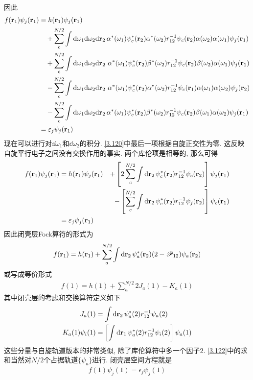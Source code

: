 因此
\begin{align}
	f(\mathbf{r}_1)\psi_j(\mathbf{r}_1) & = h(\mathbf{r}_1)\psi_j(\mathbf{r}_1)\notag\\
	& {}\quad + \sum_c^{N/2}\int\dd\omega_1\dd\omega_2\dd{r}_2\,\alpha^*(\omega_1)\psi_c^*(\mathbf{r}_2)\alpha^*(\omega_2)\twoe\psi_c(\mathbf{r}_2)\alpha(\omega_2)\alpha(\omega_1)\psi_j(\mathbf{r}_1)\notag\\
	& {}\quad + \sum_c^{N/2}\int\dd\omega_1\dd\omega_2\dd{r}_2\,\,\alpha^*(\omega_1)\psi_c^*(\mathbf{r}_2)\beta^*(\omega_2)\twoe\psi_c(\mathbf{r}_2)\beta(\omega_2)\alpha(\omega_1)\psi_j(\mathbf{r}_1)\notag\\
	& {}\quad - \sum_c^{N/2}\int\dd\omega_1\dd\omega_2\dd{r}_2\,\,\alpha^*(\omega_1)\psi_c^*(\mathbf{r}_2)\alpha^*(\omega_2)\twoe\psi_c(\mathbf{r}_1)\alpha(\omega_1)\alpha(\omega_2)\psi_j(\mathbf{r}_2)\notag\\
	& {}\quad - \sum_c^{N/2}\int\dd\omega_1\dd\omega_2\dd{r}_2\,\alpha^*(\omega_1)\psi_c^*(\mathbf{r}_2)\beta^*(\omega_2)\twoe\psi_c(\mathbf{r}_2)\beta(\omega_1)\alpha(\omega_2)\psi_j(\mathbf{r}_1)\notag\\
	& = \epsilon_j\psi_j(\mathbf{r}_1)
	\label{3.120}
\end{align}
现在可以进行对$\dd\omega_1$和$\dd\omega_2$的积分. 
\eqref{3.120}中最后一项根据自旋正交性为零. 
这反映自旋平行电子之间没有交换作用的事实. 
两个库伦项是相等的, 
那么可得
\begin{alignat}{3}
	f(\mathbf{r}_1)\psi_j(\mathbf{r}_1) 
	& = h(\mathbf{r}_1)\psi_j(\mathbf{r}_1) & + \left[ 2\sum_c^{N/2}\int\dd{r}_2\,\psi_c^*(\mathbf{r}_2)\twoe\psi_c(\mathbf{r}_2)\right]\psi_j(\mathbf{r}_1)\notag\\
	&                                       & - \left[  \sum_c^{N/2}\int\dd{r}_2\,\psi_c^*(\mathbf{r}_2)\twoe\psi_j(\mathbf{r}_2)\right]\psi_c(\mathbf{r}_1)\notag\\
	& = \epsilon_j\psi_j(\bfr_1)&
\end{alignat}
因此闭壳层Fock算符的形式为
\begin{align}
	\label{3.122}
	f(\bfr_1) = h(\bfr_1) + \sum_a^{N/2}\int\dd{r}_2\,\psi_a^*(\bfr_2)(2-\scr{P}_{12})\psi_a(\bfr_2)
\end{align}
或写成等价形式
\begin{align}
	f(1) = h(1) + \sum_a^{N/2} 2J_a(1) - K_a(1)
\end{align}
其中闭壳层的考虑和交换算符定义如下
\begin{align}
	J_a(1) & = \int\dd{r}_2\,\psi_a^*(2)\twoe\psi_a(2)\\
	K_a(1) \psi_i(1) & = \left[ \int\dd{r}_1\,\psi_a^*(2)\twoe\psi_i(2) \right]\psi_a(1)
\end{align}
这些分量与自旋轨道版本的非常类似, 
除了库伦算符中多一个因子$2$. 
\eqref{3.122}中的求和当然对$N/2$个占据轨道$\{\psi_a\}$进行. 
闭壳层空间\hft 方程就是
\begin{align}
	f(1)\psi_j(1) = \epsilon_j\psi_j(1)
\end{align}

